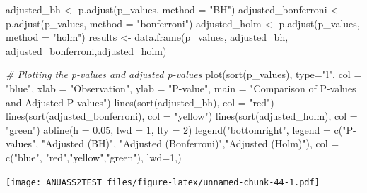 \documentclass[
]{article}
\newenvironment{Shaded}{\begin{snugshade}}{\end{snugshade}}
\newcommand{\AttributeTok}[1]{\textcolor[rgb]{0.77,0.63,0.00}{#1}}
\newcommand{\CommentTok}[1]{\textcolor[rgb]{0.56,0.35,0.01}{\textit{#1}}}
\newcommand{\DecValTok}[1]{\textcolor[rgb]{0.00,0.00,0.81}{#1}}
\newcommand{\FloatTok}[1]{\textcolor[rgb]{0.00,0.00,0.81}{#1}}
\newcommand{\FunctionTok}[1]{\textcolor[rgb]{0.00,0.00,0.00}{#1}}
\newcommand{\NormalTok}[1]{#1}
\newcommand{\OtherTok}[1]{\textcolor[rgb]{0.56,0.35,0.01}{#1}}
\newcommand{\StringTok}[1]{\textcolor[rgb]{0.31,0.60,0.02}{#1}}
\begin{document}
\begin{Shaded}
\begin{Highlighting}[]
\NormalTok{adjusted\_bh }\OtherTok{\textless{}{-}} \FunctionTok{p.adjust}\NormalTok{(p\_values, }\AttributeTok{method =} \StringTok{"BH"}\NormalTok{)}
\NormalTok{adjusted\_bonferroni }\OtherTok{\textless{}{-}} \FunctionTok{p.adjust}\NormalTok{(p\_values, }\AttributeTok{method =} \StringTok{"bonferroni"}\NormalTok{)}
\NormalTok{adjusted\_holm }\OtherTok{\textless{}{-}} \FunctionTok{p.adjust}\NormalTok{(p\_values, }\AttributeTok{method =} \StringTok{"holm"}\NormalTok{)}
\NormalTok{results }\OtherTok{\textless{}{-}} \FunctionTok{data.frame}\NormalTok{(p\_values, adjusted\_bh, adjusted\_bonferroni,adjusted\_holm)}

\CommentTok{\# Plotting the p{-}values and adjusted p{-}values}
\FunctionTok{plot}\NormalTok{(}\FunctionTok{sort}\NormalTok{(p\_values), }\AttributeTok{type=}\StringTok{"l"}\NormalTok{, }\AttributeTok{col =} \StringTok{"blue"}\NormalTok{, }\AttributeTok{xlab =} \StringTok{"Observation"}\NormalTok{, }\AttributeTok{ylab =} \StringTok{"P{-}value"}\NormalTok{,}
     \AttributeTok{main =} \StringTok{"Comparison of P{-}values and Adjusted P{-}values"}\NormalTok{)}
\FunctionTok{lines}\NormalTok{(}\FunctionTok{sort}\NormalTok{(adjusted\_bh), }\AttributeTok{col =} \StringTok{"red"}\NormalTok{)}
\FunctionTok{lines}\NormalTok{(}\FunctionTok{sort}\NormalTok{(adjusted\_bonferroni),  }\AttributeTok{col =} \StringTok{"yellow"}\NormalTok{)}
\FunctionTok{lines}\NormalTok{(}\FunctionTok{sort}\NormalTok{(adjusted\_holm), }\AttributeTok{col =} \StringTok{"green"}\NormalTok{)}
\FunctionTok{abline}\NormalTok{(}\AttributeTok{h =} \FloatTok{0.05}\NormalTok{, }\AttributeTok{lwd =} \DecValTok{1}\NormalTok{, }\AttributeTok{lty =} \DecValTok{2}\NormalTok{)}
\FunctionTok{legend}\NormalTok{(}\StringTok{"bottomright"}\NormalTok{, }\AttributeTok{legend =} \FunctionTok{c}\NormalTok{(}\StringTok{"P{-}values"}\NormalTok{, }\StringTok{"Adjusted (BH)"}\NormalTok{, }\StringTok{"Adjusted (Bonferroni)"}\NormalTok{,}\StringTok{"Adjusted (Holm)"}\NormalTok{),}
       \AttributeTok{col =} \FunctionTok{c}\NormalTok{(}\StringTok{"blue"}\NormalTok{, }\StringTok{"red"}\NormalTok{,}\StringTok{"yellow"}\NormalTok{,}\StringTok{"green"}\NormalTok{), }\AttributeTok{lwd=}\DecValTok{1}\NormalTok{,)}
\end{Highlighting}
\end{Shaded}

\texttt{[image: ANUASS2TEST\_files/figure-latex/unnamed-chunk-44-1.pdf]}
\end{document}
